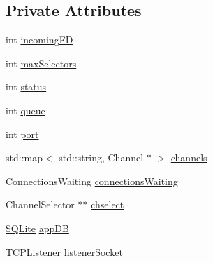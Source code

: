 \subsection*{\-Private \-Attributes}
\begin{DoxyCompactItemize}
\item 
int \hyperlink{classListenerClass_aa89d7f1e7689480cba000b3c0fa8b6c2}{incoming\-F\-D}
\item 
int \hyperlink{classListenerClass_a893af73361a8309146dd32f2ea25ad84}{max\-Selectors}
\item 
int \hyperlink{classListenerClass_ac7e26fe8e0be92e2f3a789bec5ef0769}{status}
\item 
int \hyperlink{classListenerClass_a549253403e548ddd2686076affd5ec94}{queue}
\item 
int \hyperlink{classListenerClass_a12f33aca6bb74c05fc425e0a95b43ed7}{port}
\item 
std\-::map$<$ std\-::string, \-Channel $\ast$ $>$ \hyperlink{classListenerClass_a117b3a05516645559a9d2ebfc59e402d}{channels}
\item 
\-Connections\-Waiting \hyperlink{classListenerClass_a042f0c9bc8ae4ea89fdf667cac503362}{connections\-Waiting}
\item 
\-Channel\-Selector $\ast$$\ast$ \hyperlink{classListenerClass_a464fae6bbe88763173d475959707a9ce}{chselect}
\item 
\hyperlink{classSQLite}{\-S\-Q\-Lite} \hyperlink{classListenerClass_ab12f05f1fd420de2c5af04a7ecbeba4d}{app\-D\-B}
\item 
\hyperlink{classTCPListener}{\-T\-C\-P\-Listener} \hyperlink{classListenerClass_abf5a4811e19cc0c23a3cdcc08f43a09f}{listener\-Socket}
\end{DoxyCompactItemize}


